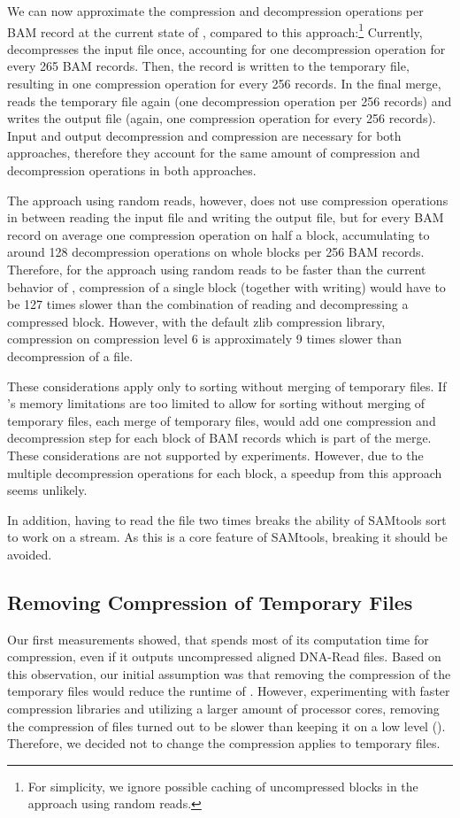 We can now approximate the compression and decompression operations per BAM record at the current state of \sort, compared to this approach:\footnote{For simplicity, we ignore possible caching of uncompressed blocks in the approach using random reads.} Currently, \sort decompresses the input file once, accounting for one decompression operation for every 265 BAM records. Then, the record is written to the temporary file, resulting in one compression operation for every 256 records. In the final merge, \sort reads the temporary file again (one decompression operation per 256 records) and writes the output file (again, one compression operation for every 256 records). Input and output decompression and compression are necessary for both approaches, therefore they account for the same amount of compression and decompression operations in both approaches.

The approach using random reads, however, does not use compression operations in between reading the input file and writing the output file, but for every BAM record on average one compression operation on half a block, accumulating to around 128 decompression operations on whole blocks per 256 BAM records. Therefore, for the approach using random reads to be faster than the current behavior of \sort, compression of a single block (together with writing) would have to be 127 times slower than the combination of reading and decompressing a compressed block. However, with the default zlib compression library, compression on compression level 6 is approximately 9 times slower than decompression of a file. 

These considerations apply only to sorting without merging of temporary files. If \sort's memory limitations are too limited to allow for sorting without merging of temporary files, each merge of temporary files, would add one compression and decompression step for each block of BAM records which is part of the merge. These considerations are not supported by experiments. However, due to the multiple decompression operations for each block, a speedup from this approach seems unlikely.

In addition, having to read the file two times breaks the ability of SAMtools sort to work on a stream. As this is a core feature of SAMtools, breaking it should be avoided.

\subsection{Removing Compression of Temporary Files}
Our first measurements showed, that \sort spends most of its computation time for compression, even if it outputs uncompressed aligned DNA-Read files. Based on this observation, our initial assumption was that removing the compression of the temporary files would reduce the runtime of \sort. However, experimenting with faster compression libraries and utilizing a larger amount of processor cores, removing the compression of files turned out to be slower than keeping it on a low level (). Therefore, we decided not to change the compression \sort applies to temporary files. 